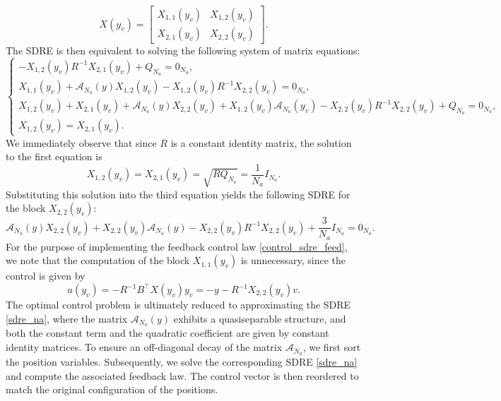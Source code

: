\documentclass[a4paper,10pt]{article}
\begin{document}
$$
X(y_v) = \begin{bmatrix} X_{1,1}(y_v) & X_{1,2}(y_v) \\ X_{2,1}(y_v) & X_{2,2}(y_v) \end{bmatrix}.
$$
The SDRE is then equivalent to solving the following system of matrix equations:
$$
\begin{cases}
-X_{1,2}(y_v) R^{-1} X_{2,1}(y_v) + Q_{N_a}=0_{N_a}, \\
X_{1,1}(y_v)+\mathcal{A}_{N_a}(y) X_{1,2}(y_v) - X_{1,2}(y_v) R^{-1} X_{2,2}(y_v)=0_{N_a},\\
X_{1,2}(y_v)+X_{2,1}(y_v)+\mathcal{A}_{N_a}(y) X_{2,2}(y_v) + X_{1,2}(y_v) \mathcal{A}_{N_a}(y_v) - X_{2,2}(y_v) R^{-1} X_{2,2}(y_v)+ Q_{N_a}=0_{N_a},\\
X_{1,2}(y_v) = X_{2,1}(y_v).
\end{cases}
$$
We immediately observe that since $R$ is a constant identity matrix, the solution to the first equation is
\begin{equation*}
X_{1,2}(y_v) = X_{2,1}(y_v) = \sqrt{R Q_{N_a}} = \frac{1}{N_a} I_{N_a}.
\end{equation*}
Substituting this solution into the third equation yields the following SDRE for the block $X_{2,2}(y_v)$:
\begin{equation}
\mathcal{A}_{N_a}(y) X_{2,2}(y_v) + X_{2,2}(y_v) \mathcal{A}_{N_a}(y) - X_{2,2}(y_v) R^{-1} X_{2,2}(y_v)+ \frac{3}{N_a} I_{N_a}= 0_{N_a}.
\label{sdre_na}
\end{equation}
For the purpose of implementing the feedback control law \eqref{control_sdre_feed}, we note that the computation of the block $X_{1,1}(y_v)$ is unnecessary, since the control is given by
$$
u(y_v) = -R^{-1} B^{\top} X(y_v)y_v=-y-R^{-1}X_{2,2}(y_v)v.
$$
The optimal control problem is ultimately reduced to approximating the SDRE \eqref{sdre_na}, where the matrix $\mathcal{A}_{N_a}(y)$ exhibits a quasiseparable structure, and both the constant term and the quadratic coefficient are given by constant identity matrices.
To ensure an off-diagonal decay of the matrix $\mathcal{A}_{N_a}$, we first sort the position variables. Subsequently, we solve the corresponding SDRE \eqref{sdre_na} and compute the associated feedback law. The control vector is then reordered to match the original configuration of the positions.
\end{document}
